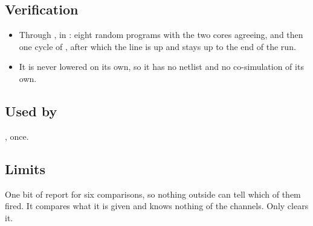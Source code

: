 \subsection*{Verification}

\begin{itemize}
\item Through , in : eight random
programs with the two cores agreeing, and then one cycle of
, after which the line is up and stays up to the end of the
run.
\item It is never lowered on its own, so it has no netlist and no
co-simulation of its own.
\end{itemize}

\subsection*{Used by}

, once.

\subsection*{Limits}

One bit of report for six comparisons, so nothing outside can tell
which of them fired. It compares what it is given and knows nothing of
the channels. Only  clears it.
